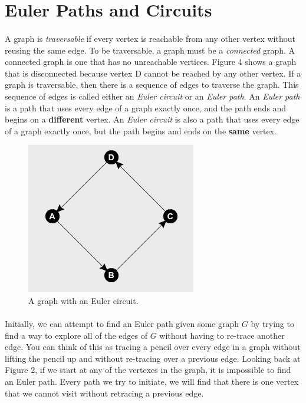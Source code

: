 \documentclass{article}
\begin{document}
\section*{Euler Paths and Circuits}
\paragraph{}
A graph is \textit{traversable} if every vertex is reachable from any other vertex without reusing the same edge. To be traversable, a graph must be a \textit{connected} graph. A connected graph is one that has no unreachable vertices. Figure 4 shows a graph that is disconnected because vertex D cannot be reached by any other vertex. If a graph is traversable, then there is a sequence of edges to traverse the graph. This sequence of edges is called either an \textit{Euler circuit} or an \textit{Euler path}. An \textit{Euler path} is a path that uses every edge of a graph exactly once, and the path ends and begins on a \textbf{different} vertex. An \textit{Euler circuit} is also a path that uses every edge of a graph exactly once, but the path begins and ends on the \textbf{same} vertex.

\begin{figure}[H]
    \centering
    \includegraphics[width=.5\linewidth, height=.3\textheight]{euler_circuit}
    \caption{A graph with an Euler circuit.}
\end{figure}

\paragraph{}
Initially, we can attempt to find an Euler path given some graph $G$ by trying to find a way to explore all of the edges of $G$ without having to re-trace another edge. You can think of this as tracing a pencil over every edge in a graph without lifting the pencil up and without re-tracing over a previous edge. Looking back at Figure 2, if we start at any of the vertexes in the graph, it is impossible to find an Euler path. Every path we try to initiate, we will find that there is one vertex that we cannot visit without retracing a previous edge.
\end{document}
